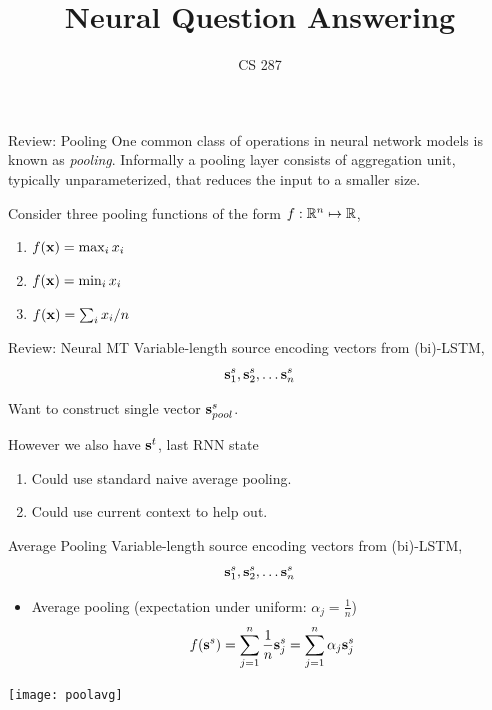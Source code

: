 \documentclass{beamer}
\title{Neural Question Answering}
\date{}
\author{CS 287}
\begin{document}
\begin{frame}
  \titlepage
\end{frame}

\begin{frame}{Review: Pooling}
  One common class of operations in neural network models is known as
  \textit{pooling}. Informally a pooling layer consists of aggregation
  unit, typically unparameterized, that reduces the input to a smaller
  size.
  \air

  Consider three pooling functions of the form $f: \mathbb{R}^n \mapsto \mathbb{R}$,
  \begin{enumerate}
  \item $ f(\mathbf{x}) = \max_{i} x_i $
  \item $ f(\mathbf{x}) = \min_{i} x_i $
  \item $ f(\mathbf{x}) = \sum_i x_i / n $
  \end{enumerate}
  \air

\end{frame}

\begin{frame}{Review: Neural MT}
  Variable-length source encoding vectors from (bi)-LSTM,
  \[ \mathbf{s}_1^s, \mathbf{s}_2^s, \ldots \mathbf{s}_n^s \] 
  
  Want to construct single vector $\mathbf{s}^s_{pool}$.
  \air 


  However we also have $\mathbf{s}^t$, last RNN state 
  \air 

  \begin{enumerate}
  \item Could use standard naive average pooling.
    \air
  \item Could use current context to help out.
  \end{enumerate}
\end{frame}


\begin{frame}{Average Pooling}
  Variable-length source encoding vectors from (bi)-LSTM,
  \[ \mathbf{s}_1^s, \mathbf{s}_2^s, \ldots \mathbf{s}_n^s \] 

  \begin{itemize}
  \item Average pooling (expectation under uniform: $\alpha_j = \frac{1}{n}$)
    \[ f(\mathbf{s}^s) = \sum_{j=1}^n \frac{1}{n} \mathbf{s}_j^s = \sum_{j=1}^n \alpha_j \mathbf{s}_j^s \] 
  \end{itemize}

  \begin{center}
    \texttt{[image: poolavg]}
  \end{center}
\end{frame}
\end{document}
